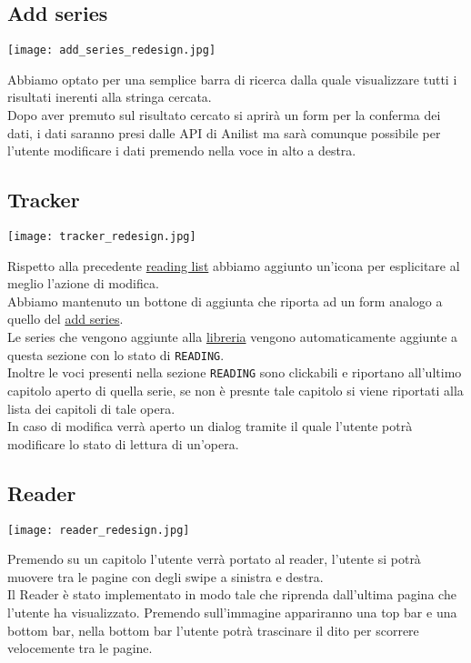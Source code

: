 \documentclass[../Assignment-3-LPSMT.tex]{subfiles}
\begin{document}
\subsection{Add series}\label{sec:add_series_redesign}

\begin{center}
   \texttt{[image: add\_series\_redesign.jpg]}
\end{center}

Abbiamo optato per una semplice barra di ricerca dalla quale visualizzare tutti i risultati inerenti alla stringa cercata.\\
Dopo aver premuto sul risultato cercato si aprirà un form per la conferma dei dati, i dati saranno presi dalle API di Anilist ma sarà comunque possibile per l'utente modificare i dati premendo nella voce in alto a destra.

\subsection{Tracker}

\begin{center}
   \texttt{[image: tracker\_redesign.jpg]}
\end{center}

 Rispetto alla precedente \hyperref[sec:reading_list]{reading list} abbiamo aggiunto un'icona per esplicitare al meglio l'azione di modifica.\\
 Abbiamo mantenuto un bottone di aggiunta che riporta ad un form analogo a quello del \hyperref[sec:add_series_redesign]{add series}.\\
 Le series che vengono aggiunte alla \hyperref[sec:home_redesign]{libreria} vengono automaticamente aggiunte a questa sezione con lo stato di \texttt{READING}.\\
 Inoltre le voci presenti nella sezione \texttt{READING} sono clickabili e riportano all'ultimo capitolo aperto di quella serie, se non è presnte tale capitolo si viene riportati alla lista dei capitoli di tale opera.\\
 In caso di modifica verrà aperto un dialog tramite il quale l'utente potrà modificare lo stato di lettura di un'opera.

\subsection{Reader}

\begin{center}
   \texttt{[image: reader\_redesign.jpg]}
\end{center}

Premendo su un capitolo l'utente verrà portato al reader, l'utente si potrà muovere tra le pagine con degli swipe a sinistra e destra.\\
Il Reader è stato implementato in modo tale che riprenda dall'ultima pagina che l'utente ha visualizzato.
Premendo sull'immagine appariranno una top bar e una bottom bar, nella bottom bar l'utente potrà trascinare il dito per scorrere velocemente tra le pagine.
\end{document}
